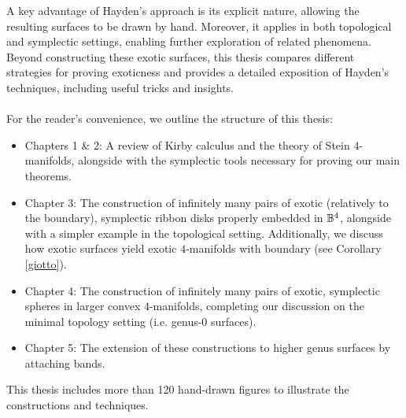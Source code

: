 \documentclass[12pt,a4paper,oneside]{book}
\begin{document}
A key advantage of Hayden’s approach is its explicit nature, allowing the resulting surfaces to be drawn by hand. Moreover, it applies in both topological and symplectic settings, enabling further exploration of related phenomena. \\
Beyond constructing these exotic surfaces, this thesis compares different strategies for proving exoticness and provides a detailed exposition of Hayden’s techniques, including useful tricks and insights. \\ \\
For the reader's convenience, we outline the structure of this thesis:
\begin{itemize}
\item Chapters 1 \& 2: A review of Kirby calculus and the theory of Stein $4$-manifolds, alongside with the symplectic tools necessary for proving our main theorems.
\item Chapter 3: The construction of infinitely many pairs of exotic (relatively to the boundary), symplectic ribbon disks properly embedded in $\mathbb{B}^4$, alongside with a simpler example in the topological setting. Additionally, we discuss how exotic surfaces yield exotic $4$-manifolds with boundary (see Corollary \ref{giotto}).
\item Chapter 4: The construction of infinitely many pairs of exotic, symplectic spheres in larger convex $4$-manifolds, completing our discussion on the minimal topology setting (i.e. genus-$0$ surfaces).
\item Chapter 5: The extension of these constructions to higher genus surfaces by attaching bands.
\end{itemize}

This thesis includes more than 120 hand-drawn figures to illustrate the constructions and techniques.






\end{document}
